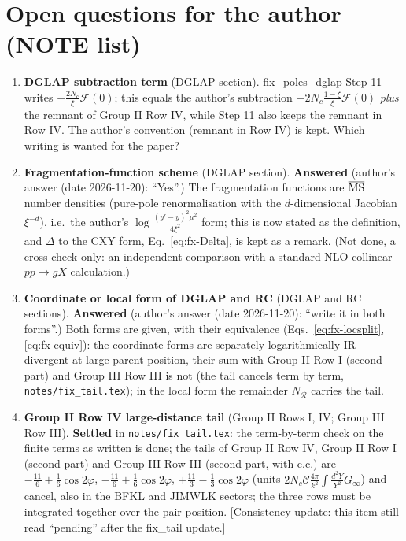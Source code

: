 {\color{red}
\section{Open questions for the author (NOTE list)}
\begin{enumerate}
\item \textbf{DGLAP subtraction term} (DGLAP section). fix\_poles\_dglap Step 11 writes $-\frac{2N_{c}}{\xi}\mathcal{F}(0)$; this equals the author's subtraction $-2N_{c}\frac{1-\xi}{\xi}\mathcal{F}(0)$ \emph{plus} the remnant of Group II Row IV, while Step 11 also keeps the remnant in Row IV. The author's convention (remnant in Row IV) is kept. Which writing is wanted for the paper?
\item \textbf{Fragmentation-function scheme} (DGLAP section). \textbf{Answered} (author's answer (date 2026-11-20): ``Yes''.) The fragmentation functions are $\overline{\rm MS}$ number densities (pure-pole renormalisation with the $d$-dimensional Jacobian $\xi^{-d}$), i.e.\ the author's $\log\frac{(y'-y)^{2}\mu^{2}}{4\xi^{2}}$ form; this is now stated as the definition, and $\Delta$ to the CXY form, Eq.~\eqref{eq:fx-Delta}, is kept as a remark. (Not done, a cross-check only: an independent comparison with a standard NLO collinear $pp\to gX$ calculation.)
\item \textbf{Coordinate or local form of DGLAP and RC} (DGLAP and RC sections). \textbf{Answered} (author's answer (date 2026-11-20): ``write it in both forms''.) Both forms are given, with their equivalence (Eqs.~\eqref{eq:fx-locsplit}, \eqref{eq:fx-equiv}): the coordinate forms are separately logarithmically IR divergent at large parent position, their sum with Group II Row I (second part) and Group III Row III is not (the tail cancels term by term, \texttt{notes/fix\_tail.tex}); in the local form the remainder $N_{\mathcal{R}}$ carries the tail.
\item \textbf{Group II Row IV large-distance tail} (Group II Rows I, IV; Group III Row III). \textbf{Settled} in \texttt{notes/fix\_tail.tex}: the term-by-term check on the finite terms as written is done; the tails of Group II Row IV, Group II Row I (second part) and Group III Row III (second part, with c.c.) are $-\frac{11}{6}+\frac16\cos2\varphi$, $-\frac{11}{6}+\frac16\cos2\varphi$, $+\frac{11}{3}-\frac13\cos2\varphi$ (units $2N_{c}\mathcal{C}\frac{4\pi}{k^{2}}\int\frac{d^{2}Y}{Y^{2}}G_{\infty}$) and cancel, also in the BFKL and JIMWLK sectors; the three rows must be integrated together over the pair position. [Consistency update: this item still read ``pending'' after the fix\_tail update.]

\end{enumerate}}
